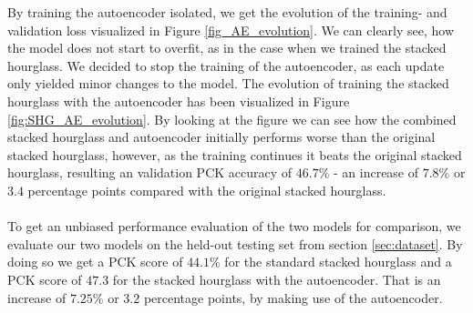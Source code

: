 \documentclass[./main.tex]{subfiles}
\begin{document}
\noindent By training the autoencoder isolated, we get the evolution of the training- and validation loss visualized in Figure \ref{fig_AE_evolution}. We can clearly see, how the model does not start to overfit, as in the case when we trained the stacked hourglass. We decided to stop the training of the autoencoder, as each update only yielded minor changes to the model. The evolution of training the stacked hourglass with the autoencoder has been visualized in Figure \ref{fig:SHG_AE_evolution}. By looking at the figure we can see how the combined stacked hourglass and autoencoder initially performs worse than the original stacked hourglass, however, as the training continues it beats the original stacked hourglass, resulting an validation PCK accuracy of $46.7\%$ - an increase of $7.8\%$ or $3.4$ percentage points compared with the original stacked hourglass.
\\
\\
To get an unbiased performance evaluation of the two models for comparison, we evaluate our two models on the held-out testing set from section \ref{sec:dataset}. By doing so we get a PCK score of $44.1\%$ for the standard stacked hourglass and a PCK score of $47.3$ for the stacked hourglass with the autoencoder. That is an increase of $7.25\%$ or $3.2$ percentage points, by making use of the autoencoder.

\end{document}

